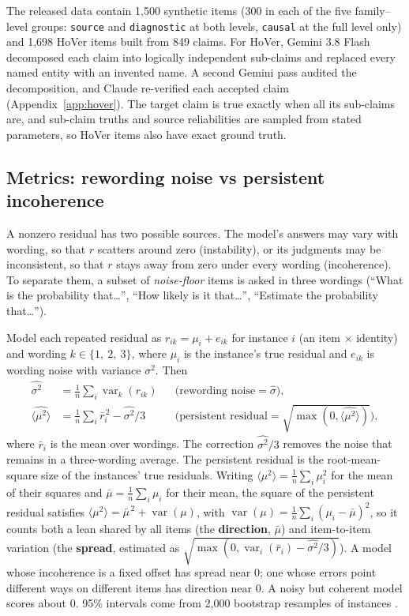 \documentclass[11pt]{article}
\begin{document}
The released data contain 1,500 synthetic items (300 in each of the five family--level groups: \texttt{source} and \texttt{diagnostic} at both levels, \texttt{causal} at the full level only) and 1,698 HoVer items built from 849 claims. For HoVer, Gemini 3.8 Flash decomposed each claim into logically independent sub-claims and replaced every named entity with an invented name. A second Gemini pass audited the decomposition, and Claude re-verified each accepted claim (Appendix~\ref{app:hover}). The target claim is true exactly when all its sub-claims are, and sub-claim truths and source reliabilities are sampled from stated parameters, so HoVer items also have exact ground truth.

\subsection{Metrics: rewording noise vs persistent incoherence}
\label{sec:metrics}

A nonzero residual has two possible sources. The model's answers may vary with wording, so that $r$ scatters around zero (instability), or its judgments may be inconsistent, so that $r$ stays away from zero under every wording (incoherence). To separate them, a subset of \emph{noise-floor} items is asked in three wordings (``What is the probability that\dots'', ``How likely is it that\dots'', ``Estimate the probability that\dots'').

Model each repeated residual as $r_{ik}=\mu_i+e_{ik}$ for instance $i$ (an item $\times$ identity) and wording $k\in\{1,\ 2,\ 3\}$, where $\mu_i$ is the instance's true residual and $e_{ik}$ is wording noise with variance $\sigma^2$. Then
\begin{align}
\widehat{\sigma^2} &= \tfrac{1}{n}\textstyle\sum_i \operatorname{var}_k(r_{ik}) && \text{(rewording noise}=\widehat\sigma), \\
\widehat{\langle\mu^2\rangle} &= \tfrac{1}{n}\textstyle\sum_i \bar r_i^{\,2} - \widehat{\sigma^2}/3 && \text{(persistent residual}=\textstyle\sqrt{\max(0,\widehat{\langle\mu^2\rangle})}),
\label{eq:persistent}
\end{align}
where $\bar r_i$ is the mean over wordings. The correction $\widehat{\sigma^2}/3$ removes the noise that remains in a three-wording average. The persistent residual is the root-mean-square size of the instances' true residuals. Writing $\langle\mu^2\rangle=\frac1n\sum_i\mu_i^2$ for the mean of their squares and $\bar\mu=\frac1n\sum_i\mu_i$ for their mean, the square of the persistent residual satisfies $\langle\mu^2\rangle=\bar\mu^{\,2}+\operatorname{var}(\mu)$, with $\operatorname{var}(\mu)=\frac1n\sum_i(\mu_i-\bar\mu)^2$, so it counts both a lean shared by all items (the \textbf{direction}, $\bar\mu$) and item-to-item variation (the \textbf{spread}, estimated as $\sqrt{\max(0,\operatorname{var}_i(\bar r_i)-\widehat{\sigma^2}/3)}$). A model whose incoherence is a fixed offset has spread near 0; one whose errors point different ways on different items has direction near 0. A noisy but coherent model scores about 0. 95\% intervals come from 2,000 bootstrap resamples of instances \citep{efron1993bootstrap}.
\end{document}
